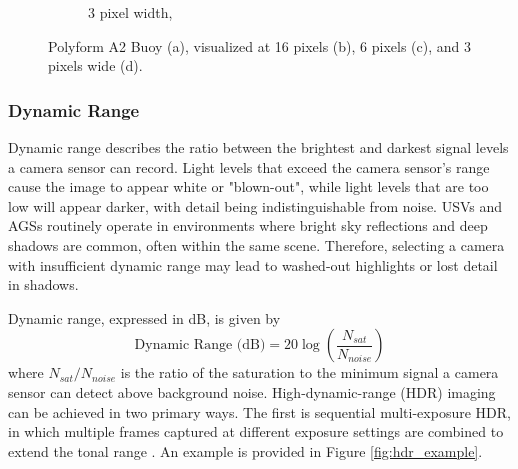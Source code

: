\documentclass[../main.tex]{subfiles}
\begin{document}
\begin{figure}[htbp]
\begin{subfigure}[t]{0.245\textwidth}
    \caption{
    3 pixel width,\\  
    }
    \label{fig:A2_3px}
\end{subfigure}
\caption{Polyform A2 Buoy (a), visualized at 16 pixels (b), 6 pixels (c), and 3 pixels wide (d).}
\label{fig:A2_multi_res}
\end{figure}




\subsubsection{Dynamic Range}
Dynamic range describes the ratio between the brightest and darkest signal levels a camera sensor can record.
Light levels that exceed the camera sensor's range cause the image to appear white or "blown-out", while light levels that are too low will appear darker, with detail being indistinguishable from noise.
\acp{USV} and \acp{AGS} routinely operate in environments where bright sky reflections and deep shadows are common, often within the same scene.
Therefore, selecting a camera with insufficient dynamic range may lead to washed-out highlights or lost detail in shadows.

Dynamic range, expressed in dB, is given by
\begin{equation}
 \text{Dynamic Range (dB)} = 20 \log{\left( \frac{N_{sat}}{N_{noise}}\right) }
\end{equation}
where $N_{sat}/N_{noise}$ is the ratio of the saturation to the minimum signal a camera sensor can detect above background noise.
High-dynamic-range (HDR) imaging can be achieved in two primary ways. 
The first is sequential multi-exposure \ac{HDR}, in which multiple frames captured at different exposure settings are combined to extend the tonal range \cite{Reinhard2010}. An example is provided in Figure \ref{fig:hdr_example}.
\end{document}
